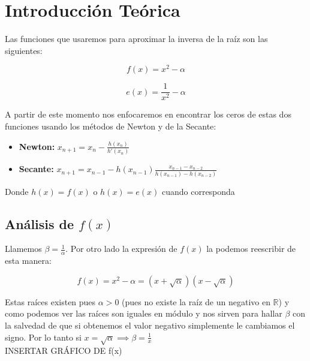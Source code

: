 \section{Introducción Teórica}

Las funciones que usaremos para aproximar la inversa de la raíz son las siguientes:

\begin{displaymath}
    f(x) = x^2 - \alpha
\end{displaymath}

\begin{displaymath}
    e(x) = \frac{1}{x^2} - \alpha
\end{displaymath}

A partir de este momento nos enfocaremos en encontrar los ceros de estas dos funciones usando los métodos de Newton y de la Secante:

\begin{itemize}
    \item {\bf Newton:} $\displaystyle x_{n + 1} = x_n - \frac{h(x_n)}{h'(x_n)}$

    \item {\bf Secante:} $\displaystyle x_{n + 1} = x_{n - 1} - h(x_{n - 1})\frac{x_{n - 1} - x_{n - 2}}{h(x_{n - 1}) - h(x_{n - 2})}$
\end{itemize}

Donde $h(x) = f(x)$ o $h(x) = e(x)$ cuando corresponda 

\subsection{Análisis de $f(x)$}

Llamemos $\displaystyle \beta = \frac{1}{\alpha}$. Por otro lado la expresión de $f(x)$ la podemos reescribir de esta manera:

\begin{displaymath}
    f(x) = x^2 - \alpha = (x + \sqrt{\alpha})(x - \sqrt{\alpha})
\end{displaymath}

Estas raíces existen pues $\alpha > 0$ (pues no existe la raíz de un negativo en $\mathbb{R}$) y como podemos ver las raíces son iguales en módulo y nos sirven para hallar $\beta$ con la salvedad de que si obtenemos el valor negativo simplemente le cambiamos el signo. Por lo tanto si $\displaystyle x = \sqrt{\alpha} \implies \beta = \frac{1}{x}$\\

INSERTAR GRÁFICO DE f(x)\\

